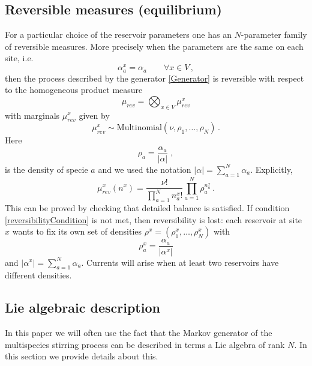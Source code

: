 \documentclass[10pt]{article}
\numberwithin{equation}{section}
\numberwithin{equation}{subsection}
\newcommand{\co}{\;,}
\newcommand{\twoj}{\nu}
\begin{document}
\subsection{Reversible measures (equilibrium)}
For a particular choice of the reservoir parameters one has an $N$-parameter family of reversible measures. More precisely
when the parameters are the same on each site, i.e.
\begin{equation}\label{reversibilityCondition}
\alpha_{a}^{x}=\alpha_{a}\qquad \forall x\in V\,,
\end{equation}
then the process described by the generator \eqref{Generator} is reversible with respect to the 
homogeneous product measure 
\begin{equation}
\label{reversibleMeasure}
\mu_{rev}=\bigotimes_{x\in V}\mu_{rev}^{x}
\end{equation}
with marginals $\mu_{rev}^{x}$ given by 
\begin{equation}
 \mu^{x}_{rev}\sim \text{Multinomial}\left(\twoj,\rho_{1},\ldots,\rho_{N}\right)\,.
\end{equation}
Here
 $$
\rho_{a}=\frac{\alpha_{a}}{|\alpha|}\co
$$
is the density of specie $a$ and we used the notation $|\alpha|=\sum_{a=1}^{N}\alpha_{a}$. Explicitly, 
\begin{equation}
\mu_{rev}^{x}(n^{x})=\frac{\nu!}{\prod_{a=1}^{N}n_{a}^{x}!}\prod_{a=1}^{N}\rho_{a}^{n_{a}^{x}}\,.
\end{equation}
This can be proved  by checking that detailed balance is satisfied. 
If condition \eqref{reversibilityCondition} is not met, then reversibility is lost: each reservoir at site $x$ wants to fix its own set of densities $\rho^{x}=(\rho_{1}^{x},\ldots,\rho_{N}^{x})$ with
\begin{equation}
\label{rhox}
\rho_{a}^x=\frac{\alpha_{a}}{|\alpha^x|}
\end{equation}
and  $|\alpha^x|=\sum_{a=1}^{N}\alpha_{a}$. 
Currents will arise when at least two reservoirs have different densities. 

\subsection{Lie algebraic description}

In this paper we will often use the fact that the Markov generator of the multispecies stirring process can be described in terms a Lie algebra of rank $N$.
In this section we provide details about this.
\end{document}
